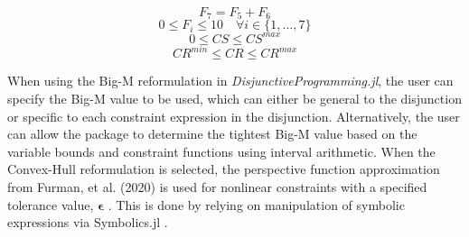 \documentclass{juliacon}
\begin{document}
\begin{equation}
    \label{eq:example_global1}
    F_7 = F_5 + F_6
\end{equation}
\begin{equation}
    \label{eq:example_var1}
    0 \leq F_i \leq 10 \quad \forall i \in \{1,...,7\}
\end{equation}
\begin{equation}
    \label{eq:example_var2}
    0 \leq CS \leq CS^{max}
\end{equation}
\begin{equation}
    \label{eq:example_var3}
    CR^{min} \leq CR \leq CR^{max}
\end{equation}

When using the Big-M reformulation in \textit{DisjunctiveProgramming.jl}, the user can specify the Big-M value to be used, which can either be general to the disjunction or specific to each constraint expression in the disjunction. Alternatively, the user can allow the package to determine the tightest Big-M value based on the variable bounds and constraint functions using interval arithmetic. When the Convex-Hull reformulation is selected, the perspective function approximation from Furman, et al. (2020) is used for nonlinear constraints with a specified  tolerance value, $\boldsymbol{\epsilon}$  \cite{furman_sawaya_grossmann_2020}. This is done by relying on manipulation of symbolic expressions via Symbolics.jl \cite{10.1145/3511528.3511535}.
\vskip 6pt
\end{document}
